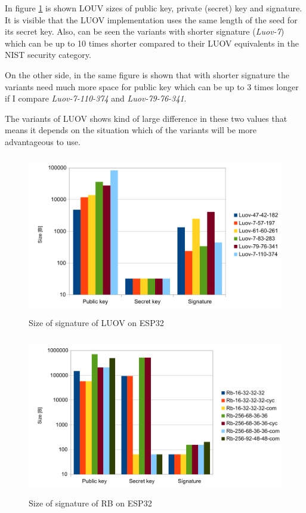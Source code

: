 \documentclass[thesis=M,english]{FITthesis}[2019/12/23]
\begin{document}
\bigskip
\noindent
In figure \ref{sign-luov} is shown LOUV sizes of public key, private (secret) key and signature. It is visible that the LUOV implementation uses the same length of the seed for its secret key. Also, can be seen the variants with shorter signature (\textit{Luov-7}) which can be up to 10 times shorter compared to their LUOV equivalents in the NIST security category.

\bigskip
\noindent
On the other side, in the same figure is shown that with shorter signature the variants need much more space for public key which can be up to 3 times longer if I compare \textit{Luov-7-110-374} and \textit{Luov-79-76-341}.

\bigskip
\noindent
The variants of LUOV shows kind of large difference in these two values that means it depends on the situation which of the variants will be more advantageous to use.

\begin{figure}[H]
\centering
\includegraphics[width=13cm,height=7cm]{images/sign-luov.pdf}
\caption{Size of signature of LUOV on ESP32}
\label{sign-luov}
\end{figure}

\begin{figure}[H]
\centering
\includegraphics[width=13cm,height=7cm]{images/sign-rb.pdf}
\caption{Size of signature of RB on ESP32}
\label{sign-rb}
\end{figure}
\end{document}
